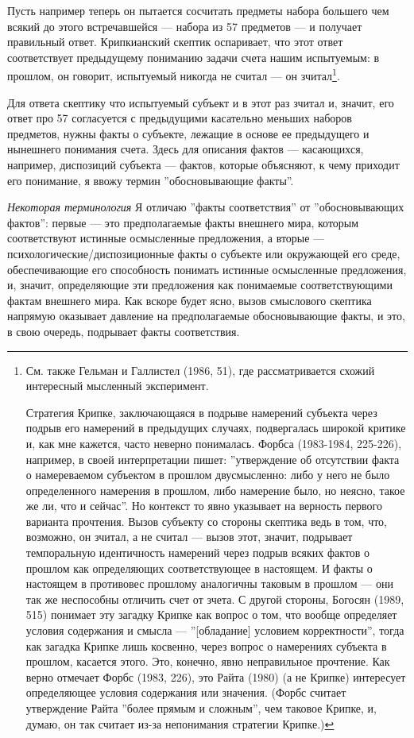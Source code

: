 \documentclass[12pt]{book}
\begin{document}
Пусть например теперь он пытается сосчитать предметы набора большего чем всякий до этого встречавшейся --- набора из 57 предметов --- и получает правильный ответ. Крипкианский скептик оспаривает, что этот ответ соответствует предыдущему пониманию задачи счета нашим испытуемым: в прошлом, он говорит, испытуемый никогда не считал --- он зчитал\footnote{См. также Гельман и Галлистел (1986, 51), где рассматривается схожий интересный мысленный эксперимент.

Стратегия Крипке, заключающаяся в подрыве намерений субъекта через подрыв его намерений в предыдущих случаях, подвергалась широкой критике и, как мне кажется, часто неверно понималась. Форбса (1983-1984, 225-226), например, в своей интерпретации пишет: ''утверждение об отсутствии факта о намереваемом субъектом в прошлом двусмысленно: либо у него не было определенного намерения в прошлом, либо намерение было, но неясно, такое же ли, что и сейчас''. Но контекст то явно указывает на верность первого варианта прочтения. Вызов субъекту со стороны скептика ведь в том, что, возможно, он зчитал, а не считал --- вызов этот, значит, подрывает темпоральную идентичность намерений через подрыв всяких фактов о прошлом как определяющих соответствующее в настоящем. И факты о настоящем в противовес прошлому аналогичны таковым в прошлом --- они так же неспособны отличить счет от зчета. С другой стороны, Богосян (1989, 515) понимает эту загадку Крипке как вопрос о том, что вообще определяет условия содержания и смысла --- ''[обладание] условием корректности'', тогда как загадка Крипке лишь косвенно, через вопрос о намерениях субъекта в прошлом, касается этого. Это, конечно, явно неправильное прочтение. Как верно отмечает Форбс (1983, 226), это Райта (1980) (а не Крипке) интересует определяющее условия содержания или значения. (Форбс считает утверждение Райта ''более прямым и сложным'', чем таковое Крипке, и, думаю, он так считает из-за непонимания стратегии Крипке.)}.

Для ответа скептику что испытуемый субъект и в этот раз зчитал и, значит, его ответ про 57 согласуется с предыдущими касательно меньших наборов предметов, нужны факты о субъекте, лежащие в основе ее предыдущего и нынешнего понимания счета. Здесь для описания фактов --- касающихся, например, диспозиций субъекта --- фактов, которые объясняют, к чему приходит его понимание, я ввожу термин ''обосновывающие факты''.

\textit{Некоторая терминология} \quad Я отличаю ''факты соответствия'' от ''обосновывающих фактов'': первые --- это предполагаемые факты внешнего мира, которым соответствуют истинные осмысленные предложения, а вторые --- психологические/диспозиционные факты о субъекте или окружающей его среде, обеспечивающие его способность понимать истинные осмысленные предложения, и, значит, определяющие эти предложения как понимаемые соответствующими фактам внешнего мира. Как вскоре будет ясно, вызов смыслового скептика напрямую оказывает давление на предполагаемые обосновывающие факты, и это, в свою очередь, подрывает факты соответствия.
\end{document}
